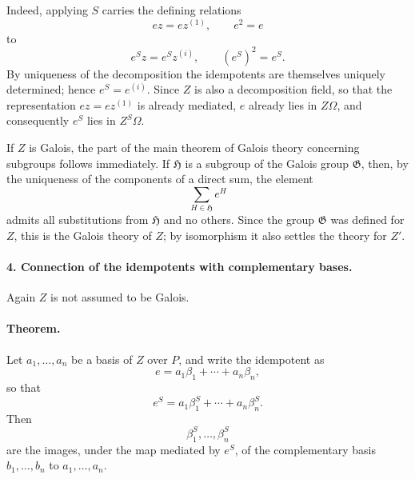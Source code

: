 \documentclass[11pt]{article}
\providecommand{\Gcal}{\mathfrak G}
\begin{document}
Indeed, applying \(S\) carries the defining relations
\[
        ez=ez^{(1)},\qquad e^2=e
\]
to
\[
        e^S z=e^S z^{(i)},\qquad (e^S)^2=e^S .
\]
By uniqueness of the decomposition the idempotents are themselves uniquely determined; hence \(e^S=e^{(i)}\). Since \(Z\) is also a decomposition field, so that the representation \(ez=ez^{(1)}\) is already mediated, \(e\) already lies in \(Z\Omega\), and consequently \(e^S\) lies in \(Z^S\Omega\).

If \(Z\) is Galois, the part of the main theorem of Galois theory concerning subgroups follows immediately. If \(\mathfrak H\) is a subgroup of the Galois group \(\Gcal\), then, by the uniqueness of the components of a direct sum, the element
\[
        \sum_{H\in\mathfrak H} e^H
\]
admits all substitutions from \(\mathfrak H\) and no others. Since the group \(\Gcal\) was defined for \(Z\), this is the Galois theory of \(Z\); by isomorphism it also settles the theory for \(Z'\).

\paragraph{4. Connection of the idempotents with complementary bases.}
Again \(Z\) is not assumed to be Galois.

\paragraph{Theorem.}
Let \(a_1,\ldots,a_n\) be a basis of \(Z\) over \(P\), and write the idempotent as
\[
        e=a_1\beta_1+\cdots+a_n\beta_n,
\]
so that
\[
        e^S=a_1\beta_1^S+\cdots+a_n\beta_n^S .
\]
Then
\[
        \beta_1^S,\ldots,\beta_n^S
\]
are the images, under the map mediated by \(e^S\), of the complementary basis \(b_1,\ldots,b_n\) to \(a_1,\ldots,a_n\).
\end{document}
